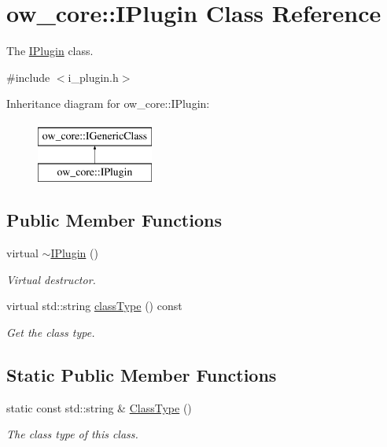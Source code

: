 \hypertarget{classow__core_1_1IPlugin}{}\section{ow\+\_\+core\+:\+:I\+Plugin Class Reference}
\label{classow__core_1_1IPlugin}


The \hyperlink{classow__core_1_1IPlugin}{I\+Plugin} class.  




{\ttfamily \#include $<$i\+\_\+plugin.\+h$>$}

Inheritance diagram for ow\+\_\+core\+:\+:I\+Plugin\+:\begin{figure}[H]
\begin{center}
\leavevmode
\includegraphics[height=2.000000cm]{d7/d66/classow__core_1_1IPlugin}
\end{center}
\end{figure}
\subsection*{Public Member Functions}
\begin{DoxyCompactItemize}
\item 
virtual \hyperlink{classow__core_1_1IPlugin_a90c54611f7b8bf246676cd7f19077053}{$\sim$\+I\+Plugin} ()\hypertarget{classow__core_1_1IPlugin_a90c54611f7b8bf246676cd7f19077053}{}\label{classow__core_1_1IPlugin_a90c54611f7b8bf246676cd7f19077053}

\begin{DoxyCompactList}\small\item\em Virtual destructor. \end{DoxyCompactList}\item 
virtual std\+::string \hyperlink{classow__core_1_1IPlugin_aff710e9ec9633592c7f013b9c85a4722}{class\+Type} () const 
\begin{DoxyCompactList}\small\item\em Get the class type. \end{DoxyCompactList}\end{DoxyCompactItemize}
\subsection*{Static Public Member Functions}
\begin{DoxyCompactItemize}
\item 
static const std\+::string \& \hyperlink{classow__core_1_1IPlugin_a55979a29b69adc98803cc6eff1f91f89}{Class\+Type} ()
\begin{DoxyCompactList}\small\item\em The class type of this class. \end{DoxyCompactList}\end{DoxyCompactItemize}


